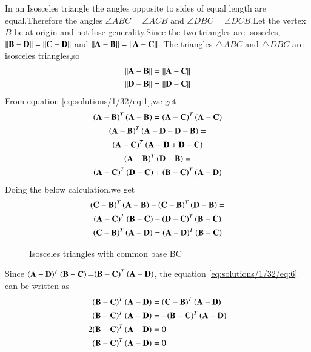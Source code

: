 In an Isosceles triangle the angles opposite to sides of equal length are equal.Therefore the angles $\angle ABC=\angle ACB$ and $\angle DBC=\angle DCB$.Let the vertex $B$ be at origin and not lose generality.Since the two triangles are isosceles,$\left\lVert\mathbf{B}-\mathbf{D}\right\rVert=\left\lVert\mathbf{C}-\mathbf{D}\right\rVert$ and $\left\lVert\mathbf{A}-\mathbf{B}\right\rVert=\left\lVert\mathbf{A}-\mathbf{C}\right\rVert$.
The triangles $\triangle ABC$ and $\triangle DBC$ are isosceles triangles,so
\begin{align}
    \left\lVert\mathbf{A}-\mathbf{B}\right\rVert = \left\lVert\mathbf{A}-\mathbf{C}\right\rVert\label{eq:solutions/1/32/eq:1}\\
    \left\lVert\mathbf{D}-\mathbf{B}\right\rVert = \left\lVert\mathbf{D}-\mathbf{C}\right\rVert\label{eq:solutions/1/32/eq:2}
\end{align}
From equation \eqref{eq:solutions/1/32/eq:1},we get
\begin{multline}
    {\ensuremath{\left(\mathbf{A}-\mathbf{B}\right)}^T\ensuremath{\left(\mathbf{A}-\mathbf{B}\right)}}={\left(\mathbf{A}-\mathbf{C}\right)^T\left(\mathbf{A}-\mathbf{C}\right)}\\
    {\left(\mathbf{A}-\mathbf{B}\right)^T\left(\mathbf{A}-\mathbf{D}+\mathbf{D}-\mathbf{B}\right)}=\\{\left(\mathbf{A}-\mathbf{C}\right)^T\left(\mathbf{A}-\mathbf{D}+\mathbf{D}-\mathbf{C}\right)}\\
    {\left(\mathbf{A}-\mathbf{B}\right)^T\left(\mathbf{D}-\mathbf{B}\right)}=\\
    {\left(\mathbf{A}-\mathbf{C}\right)^T\left(\mathbf{D}-\mathbf{C}\right)
    +\left(\mathbf{B}-\mathbf{C}\right)^T\left(\mathbf{A}-\mathbf{D}\right)}\label{eq:solutions/1/32/eq:3}
\end{multline}
Doing the below calculation,we get
\begin{multline}
    {\ensuremath{\left(\mathbf{C}-\mathbf{B}\right)}^T\ensuremath{\left(\mathbf{A}-\mathbf{B}\right)}-\ensuremath{\left(\mathbf{C}-\mathbf{B}\right)}^T\ensuremath{\left(\mathbf{D}-\mathbf{B}\right)}}=\\
    {\left(\mathbf{A}-\mathbf{C}\right)^T\left(\mathbf{B}-\mathbf{C}\right)-\left(\mathbf{D}-\mathbf{C}\right)^T\left(\mathbf{B}-\mathbf{C}\right)}\\
    {\left(\mathbf{C}-\mathbf{B}\right)^T\left(\mathbf{A}-\mathbf{D}\right)}={\left(\mathbf{A}-\mathbf{D}\right)^T\left(\mathbf{B}-\mathbf{C}\right)}\label{eq:solutions/1/32/eq:6}
\end{multline}
\begin{figure}[!h]
    \centering
    \resizebox{\columnwidth}{!}{}
    \caption{Isosceles triangles with common base BC}
    \label{eq:solutions/1/32/myfig:1}
\end{figure}
Since $\left(\mathbf{A}-\mathbf{D}\right)^T\left(\mathbf{B}-\mathbf{C}\right)$=${\left(\mathbf{B}-\mathbf{C}\right)^T\left(\mathbf{A}-\mathbf{D}\right)}$, the equation \eqref{eq:solutions/1/32/eq:6} can be written as
\begin{align}
    {\ensuremath{\left(\mathbf{B}-\mathbf{C}\right)}^T\ensuremath{\left(\mathbf{A}-\mathbf{D}\right)}}&={\left(\mathbf{C}-\mathbf{B}\right)^T\left(\mathbf{A}-\mathbf{D}\right)}\\
    {\left(\mathbf{B}-\mathbf{C}\right)^T\left(\mathbf{A}-\mathbf{D}\right)}&=-{\left(\mathbf{B}-\mathbf{C}\right)^T\left(\mathbf{A}-\mathbf{D}\right)}\\
    2{\left(\mathbf{B}-\mathbf{C}\right)^T\left(\mathbf{A}-\mathbf{D}\right)}&=0\\
    \left(\mathbf{B}-\mathbf{C}\right)^T\left(\mathbf{A}-\mathbf{D}\right)&=0\label{eq:solutions/1/32/eq:7}
\end{align}
